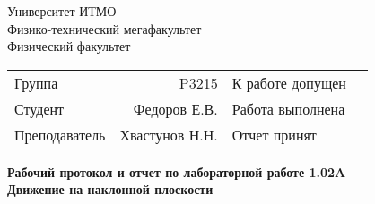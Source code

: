 \begin{titlepage}
\thispagestyle{firststyle}
\begin{center}
    Университет ИТМО \\
    Физико-технический мегафакультет \\
    Физический факультет \\
\end{center}
\vspace{1cm}
\begin{center}
    \begin{tabular}{ l r l r }
        Группа & P3215 & К работе допущен & \hspace{2cm}  \\\cline{4-4}
        Студент & Федоров Е.В. & Работа выполнена & \hspace{2cm} \\\cline{4-4}
        Преподаватель & Хвастунов Н.Н. & Отчет принят & \hspace{2cm} \\\cline{4-4}
    \end{tabular}
\end{center}

\vspace{2cm}

\begin{center}
    \Large
    \textbf{Рабочий протокол и отчет по
        лабораторной работе \textnumero 1.02A
    }
    \\
    \huge
    \textbf{Движение на наклонной плоскости}
\end{center}
\end{titlepage}
